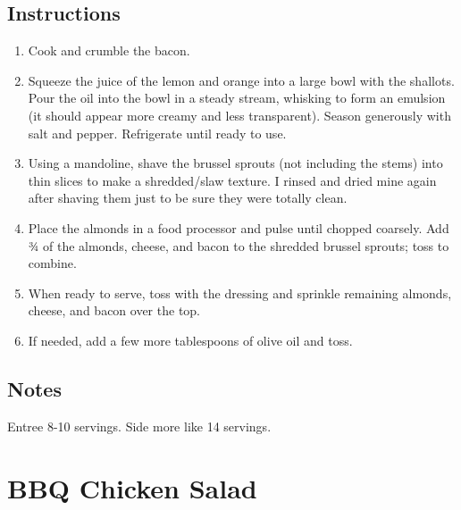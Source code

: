 \documentclass[ansiapaper,10pt,english]{sphinxmanual}
\begin{document}
\section{Instructions}
\label{\detokenize{baconbrussel:instructions}}\begin{enumerate}
\item {} 
Cook and crumble the bacon.

\item {} 
Squeeze the juice of the lemon and orange into a large bowl with the shallots. Pour the oil into the bowl in a steady stream, whisking to form an emulsion (it should appear more creamy and less transparent). Season generously with salt and pepper. Refrigerate until ready to use.

\item {} 
Using a mandoline, shave the brussel sprouts (not including the stems) into thin slices to make a shredded/slaw texture. I rinsed and dried mine again after shaving them just to be sure they were totally clean.

\item {} 
Place the almonds in a food processor and pulse until chopped coarsely. Add ¾ of the almonds, cheese, and bacon to the shredded brussel sprouts; toss to combine.

\item {} 
When ready to serve, toss with the dressing and sprinkle remaining almonds, cheese, and bacon over the top.

\item {} 
If needed, add a few more tablespoons of olive oil and toss.

\end{enumerate}


\section{Notes}
\label{\detokenize{baconbrussel:notes}}
Entree 8-10 servings.
Side more like 14 servings.


\chapter{BBQ Chicken Salad}
\label{\detokenize{BBQ_Cluck_Salad:bbq-chicken-salad}}\label{\detokenize{BBQ_Cluck_Salad::doc}}
\end{document}
